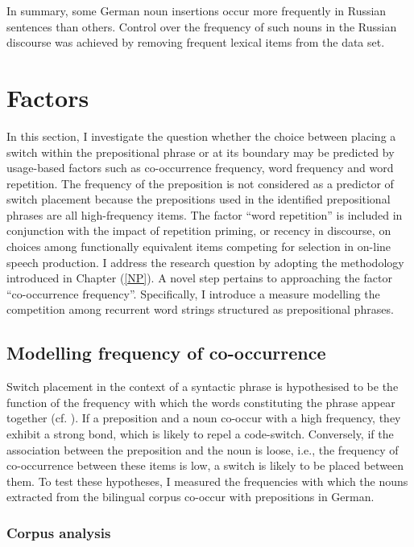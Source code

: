 In summary, some German noun insertions occur more frequently in Russian sentences than others. Control over the frequency of such nouns in the Russian discourse was achieved by removing frequent lexical items from the data set.

\section{Factors}

In this section, I investigate the question whether the choice between placing a switch within the prepositional phrase or at its boundary may be predicted by usage-based factors such as co-occurrence frequency, word frequency and word repetition. The frequency of the preposition is not considered as a predictor of switch placement because the prepositions used in the identified prepositional phrases are all high-frequency items. The factor “word repetition” is included in conjunction with the impact of repetition priming, or recency in discourse, on choices among functionally equivalent items competing for selection in on-line speech production. I address the research question by adopting the methodology introduced in Chapter (\ref{NP}). A novel step pertains to approaching the factor “co-occurrence frequency”. Specifically, I introduce a measure modelling the competition among recurrent word strings structured as prepositional phrases.

\subsection{Modelling frequency of co-occurrence}

Switch placement in the context of a syntactic phrase is hypothesised to be the function of the frequency with which the words constituting the phrase appear together (cf. \citealt[33]{bybee-book-2010}). If a preposition and a noun co-occur with a high frequency, they exhibit a strong bond, which is likely to repel a code-switch. Conversely, if the association between the preposition and the noun is loose, i.e., the frequency of co-occurrence between these items is low, a switch is likely to be placed between them. To test these hypotheses, I measured the frequencies with which the nouns extracted from the bilingual corpus co-occur with prepositions in German.

\subsubsection{Corpus analysis}

